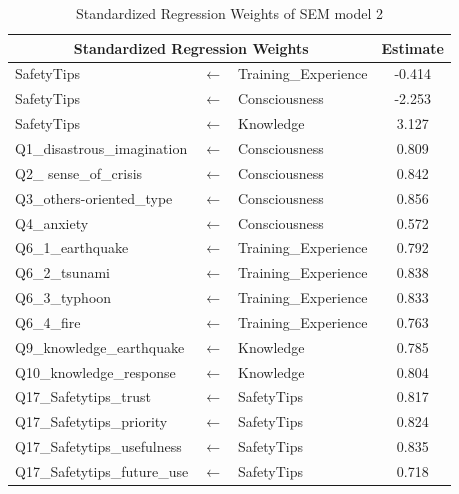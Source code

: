 \begin{table}[h]
  \caption{Standardized Regression Weights of SEM model 2 }
  \label{table12}
  \centering
  \begin{tabular}{lcl|c}
 \hline
 \multicolumn{3}{c|}{Standardized Regression Weights} & Estimate  \\
 \hline
SafetyTips              &$\longleftarrow$ & Training\_Experience & -0.414 \\
SafetyTips              &$\longleftarrow$ & Consciousness        & -2.253 \\
SafetyTips              &$\longleftarrow$ & Knowledge            & 3.127  \\
Q1\_disastrous\_imagination                      &$\longleftarrow$ & Consciousness        & 0.809  \\
Q2\_ sense\_of\_crisis                      &$\longleftarrow$ & Consciousness        & 0.842  \\
Q3\_others-oriented\_type                      &$\longleftarrow$ & Consciousness        & 0.856  \\
Q4\_anxiety                      &$\longleftarrow$ & Consciousness        & 0.572  \\
Q6\_1\_earthquake       &$\longleftarrow$ & Training\_Experience & 0.792  \\
Q6\_2\_tsunami          &$\longleftarrow$ & Training\_Experience & 0.838  \\
Q6\_3\_typhoon          &$\longleftarrow$ & Training\_Experience & 0.833  \\
Q6\_4\_fire             &$\longleftarrow$ & Training\_Experience & 0.763  \\
Q9\_knowledge\_earthquake                      &$\longleftarrow$ & Knowledge            & 0.785  \\
Q10\_knowledge\_response                     &$\longleftarrow$ & Knowledge            & 0.804  \\
Q17\_Safetytips\_trust &$\longleftarrow$ & SafetyTips           & 0.817  \\
Q17\_Safetytips\_priority &$\longleftarrow$ & SafetyTips           & 0.824  \\
Q17\_Safetytips\_usefulness &$\longleftarrow$ & SafetyTips           & 0.835  \\
Q17\_Safetytips\_future\_use &$\longleftarrow$ & SafetyTips           & 0.718  \\
 \hline
  \end{tabular}
\end{table}

